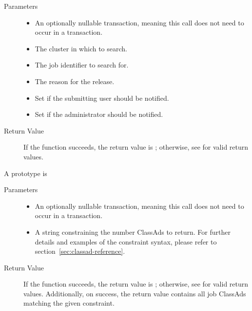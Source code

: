 \begin{description}
  \begin{description}
    \item[ Parameters]
    \begin{itemize}
      \item {} 
      An optionally nullable transaction, meaning this call does not 
      need to occur in a transaction. 
      \item {} The cluster in which to search.
      \item {} The job identifier to search for.
      \item {} The reason for the release.
      \item {}
      Set if the submitting user should be notified.
      \item {}
      Set if the administrator should be notified.
    \end{itemize}
    \item[ Return Value]
      If the function succeeds, the return value is ; 
      otherwise, see  for valid return values.
  \end{description} 


\item [\Code{getJobAds}]
  A prototype is 


  \begin{description}
    \item[ Parameters]
    \begin{itemize}
      \item {} 
      An optionally nullable transaction, meaning this call does not 
      need to occur in a transaction. 
      \item {} 
      A string constraining the number ClassAds to return. For further details 
      and examples of the constraint syntax, please refer to 
      section~\ref{sec:classad-reference}.
    \end{itemize}
    \item[ Return Value]
      If the function succeeds, the return value is ; 
      otherwise, see  for valid return values. Additionally,
      on success, the return value contains all job ClassAds matching the 
      given constraint.
  \end{description}     
  

\end{description}
